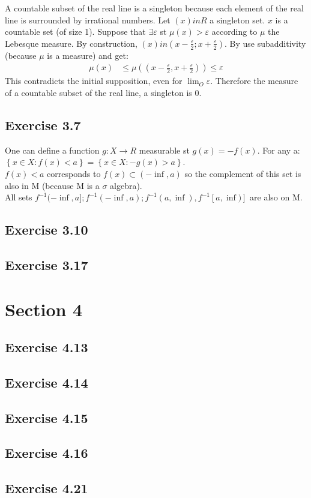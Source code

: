 \documentclass[11pt]{article}
\numberwithin{equation}{section}
\theoremstyle{plain}
\theoremstyle{definition}
\newcommand\braces[1]{\left\{ #1 \right\}}
\def\ss{\subset}
\newcommand{\1}{\mathbbm 1}
\def\s{\sigma}
\newcommand{\e}{\varepsilon}
\begin{document}
A countable subset of the real line is a singleton because each element of the real line is surrounded by irrational numbers.
Let $(x) in R$ a singleton set. $x$ is a countable set (of size 1). Suppose that $\exists \e$ st $\mu(x) > \e$ according to $\mu$ the Lebesque measure.
By construction, $(x) in (x - \frac{\e}{2} ; x + \frac{\e}{2})$.
By use subadditivity (because $\mu$ is a measure) and get:
\begin{align*}
	\mu(x) &\leq \mu((x-\frac{\e}{2}, x+\frac{\e}{2})) \leq \e
\end{align*}
This contradicts the initial supposition, even for $\lim_{O} \e$. Therefore the measure of a countable subset of the real line, a singleton is 0.




\subsection*{Exercise 3.7} %
One can define a function $g : X \to R$ measurable st $g(x) = -f(x)$. For any a:
$\braces{x \in X : f(x) <a} = \braces{x \in X : -g(x) >a}$.
\\
$f(x) < a $ corresponds to $f(x) \ss (-\inf, a) $ so the complement of this set is also in M (because M is a $\s$ algebra).
\\
All sets $f^{-1}(-\inf, a] ; f^{-1}(-\inf, a) ; f^{-1}(a, \inf) , f^{-1}[a, \inf)]$ are also on M.


\subsection*{Exercise 3.10} %

\subsection*{Exercise 3.17} %


\section*{Section 4} %
\label{sec:section_4}

\subsection*{Exercise 4.13} %

\subsection*{Exercise 4.14} %

\subsection*{Exercise 4.15} %

\subsection*{Exercise 4.16} %

\subsection*{Exercise 4.21} %
\end{document}
